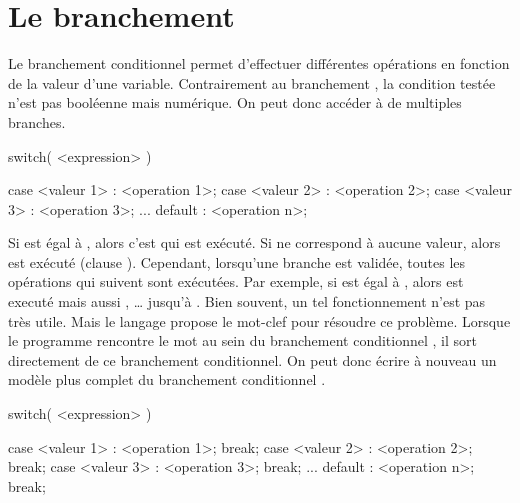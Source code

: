 \documentclass[a4paper]{article}
\begin{document}
	\section{Le branchement }
		Le branchement conditionnel  permet d'effectuer différentes opérations en fonction de la valeur d'une variable.
		Contrairement au branchement , la condition testée n'est pas booléenne mais numérique.
		On peut donc accéder à de multiples branches.
		\begin{Code*}
switch( <expression> )
{
	case <valeur 1> :
		<operation 1>;
	case <valeur 2> :
		<operation 2>;
	case <valeur 3> :
		<operation 3>;
	...
	default :
		<operation n>;

}
		\end{Code*}

		Si  est égal à , alors c'est  qui est exécuté.
		Si  ne correspond à aucune valeur, alors  est exécuté (clause ).
		Cependant, lorsqu'une branche est validée, toutes les opérations qui suivent sont exécutées.
		Par exemple, si  est égal à , alors  est executé mais aussi , \dots{} jusqu'à .
		Bien souvent, un tel fonctionnement n'est pas très utile.
		Mais le langage  propose le mot-clef  pour résoudre ce problème.
		Lorsque le programme rencontre le mot  au sein du branchement conditionnel , il sort directement de ce branchement conditionnel.
		On peut donc écrire à nouveau un modèle plus complet du branchement conditionnel .
		\begin{Code*}
switch( <expression> )
{
	case <valeur 1> :
		<operation 1>;
		break;
	case <valeur 2> :
		<operation 2>;
		break;
	case <valeur 3> :
		<operation 3>;
		break;
	...
	default :
		<operation n>;
		break;

}
		\end{Code*}
\end{document}
